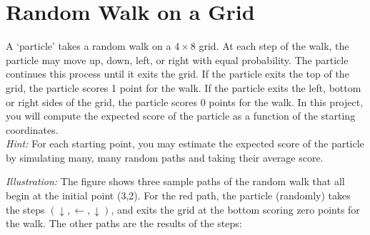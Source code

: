 \section{Random Walk on a Grid} 
A `particle' takes a random walk on a $4 \times 8$ grid. At each step of the walk, the particle may move up, down, left, or right with equal probability. The particle continues this process until it exits the grid. If the particle exits the top of the grid, the particle scores 1 point for the walk. If the particle exits the left, bottom or right sides of the grid, the particle scores 0 points for the walk. 
In this project, you will compute the expected score of the particle as a function of the starting coordinates.\\

\noindent \textit{Hint:} For each starting point, you may estimate the expected score of the particle by simulating many, many random paths and taking their average score.\\
\begin{center}
\end{center}
\textit{Illustration:} The figure shows three sample paths of the random walk that all begin at the initial point (3,2). For the red path, the particle (randomly) takes the steps $(\downarrow, \leftarrow, \downarrow)$, and exits the grid at the bottom scoring zero points for the walk. The other paths are the results of the steps:
